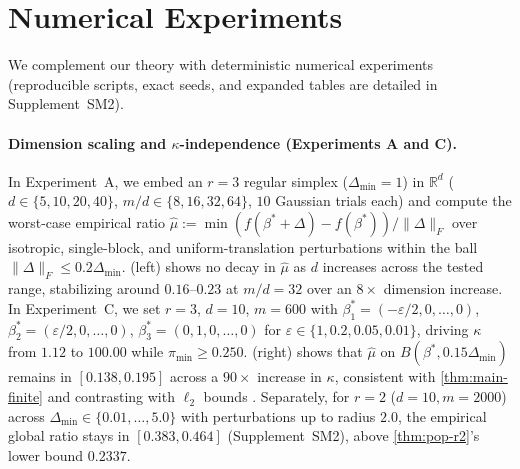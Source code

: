 \documentclass[11pt]{article}
\theoremstyle{plain}
\theoremstyle{remark}
\numberwithin{equation}{section}
\newcommand{\R}{\mathbb{R}}
\newcommand{\Fnorm}[1]{\|#1\|_F}
\begin{document}
\section{Numerical Experiments}
\label{sec:experiments}

We complement our theory with deterministic numerical experiments (reproducible scripts, exact seeds, and expanded tables are detailed in Supplement~SM2).

\paragraph{Dimension scaling and $\kappa$-independence (Experiments A and C).}
In Experiment~A, we embed an $r = 3$ regular simplex ($\Delta_{\min} = 1$) in $\R^d$ ($d \in \{5, 10, 20, 40\}$, $m/d \in \{8, 16, 32, 64\}$, $10$ Gaussian trials each) and compute the worst-case empirical ratio $\hat\mu := \min (f(\beta^* + \Delta) - f(\beta^*))/\Fnorm{\Delta}$ over isotropic, single-block, and uniform-translation perturbations within the ball $\Fnorm{\Delta} \le 0.2\Delta_{\min}$.  (left) shows no decay in $\hat\mu$ as $d$ increases across the tested range, stabilizing around $0.16$--$0.23$ at $m/d = 32$ over an $8\times$ dimension increase. In Experiment~C, we set $r = 3$, $d = 10$, $m = 600$ with $\beta_1^* = (-\varepsilon/2, 0, \dots, 0)$, $\beta_2^* = (\varepsilon/2, 0, \dots, 0)$, $\beta_3^* = (0, 1, 0, \dots, 0)$ for $\varepsilon \in \{1, 0.2, 0.05, 0.01\}$, driving $\kappa$ from $1.12$ to $100.00$ while $\pi_{\min} \ge 0.250$.  (right) shows that $\hat\mu$ on $B(\beta^*, 0.15\Delta_{\min})$ remains in $[0.138, 0.195]$ across a $90\times$ increase in $\kappa$, consistent with \cref{thm:main-finite} and contrasting with $\ell_2$ bounds \cite{ghosh2022maxaffine}. Separately, for $r = 2$ ($d = 10, m = 2000$) across $\Delta_{\min} \in \{0.01, \dots, 5.0\}$ with perturbations up to radius $2.0$, the empirical global ratio stays in $[0.383, 0.464]$ (Supplement~SM2), above \cref{thm:pop-r2}'s lower bound $0.2337$.
\end{document}

